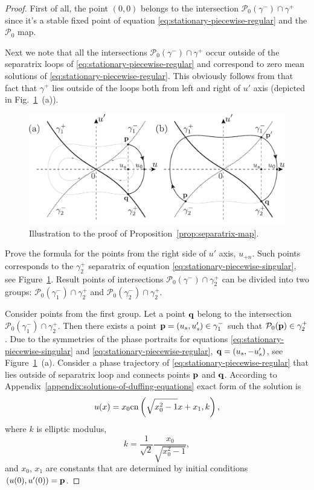 \begin{proof}
	First of all, the point $(0, 0)$ belongs to the intersection $\mathcal{P}_0(\gamma^-) \cap \gamma^+$ since it's a stable fixed point of equation \eqref{eq:stationary-piecewise-regular} and the $\mathcal{P}_0$ map.

	Next we note that all the intersections $\mathcal{P}_0(\gamma^-) \cap \gamma^+$ occur outside of the separatrix loops of \eqref{eq:stationary-piecewise-regular} and correspond to zero mean solutions of \eqref{eq:stationary-piecewise-regular}.
	This obviously follows from that fact that $\gamma^+$ lies outside of the loops both from left and right of $u'$ axis (depicted in Fig.~\ref{fig:separatrix-map}~(a)).
	\begin{figure}[h]
	\centering
		\includegraphics[scale = 1]{pic/separatrix map}
		\caption{Illustration to the proof of Proposition~\ref{prop:separatrix-map}.}
	\label{fig:separatrix-map}
	\end{figure}
	
	Prove the formula for the points from the right side of $u'$ axis, $u_{+n}$.
	Such points corresponds to the $\gamma_2^+$ separatrix of equation \eqref{eq:stationary-piecewise-singular}, see Figure~\ref{fig:separatrix-map}.
	Result points of intersections $\mathcal{P}_0(\gamma^-) \cap \gamma_2^+$ can be divided into two groups: $\mathcal{P}_0(\gamma_1^-) \cap \gamma_2^+$ and $\mathcal{P}_0(\gamma_2^-) \cap \gamma_2^+$.

	Consider points from the first group.
	Let a point $\vb{q}$ belong to the intersection $\mathcal{P}_0(\gamma_1^-) \cap \gamma_2^+$.
	Then there exists a point $\vb{p} = (u_s, u_s') \in \gamma_1^-$ such that $\mathcal{P}_0(\vb{p}) \in \gamma_2^+$.
	Due to the symmetries of the phase portraits for equations \eqref{eq:stationary-piecewise-singular} and \eqref{eq:stationary-piecewise-regular}, $\vb{q} = (u_s, -u_s')$, see Figure~\ref{fig:separatrix-map}~(a).
	Consider a phase trajectory of \eqref{eq:stationary-piecewise-regular} that lies outside of separatrix loop and connects points $\vb{p}$ and $\vb{q}$.
	According to Appendix~\ref{appendix:solutions-of-duffing-equations} exact form of the solution is
	\begin{equation}
		u(x) = x_0 \mathrm{cn} \left( \sqrt{x_0^2 - 1} x + x_1, k \right),
	\label{eq:stationary-piecewise-regular-solution}
	\end{equation}
	where $k$ is elliptic modulus,
	\begin{equation}
		k = \dfrac{1}{\sqrt{2}} \dfrac{x_0}{\sqrt{x_0^2 - 1}},
	\end{equation}
	and $x_0$, $x_1$ are constants that are determined by initial conditions $(u(0), u'(0)) = \vb{p}$.
	

\end{proof}
